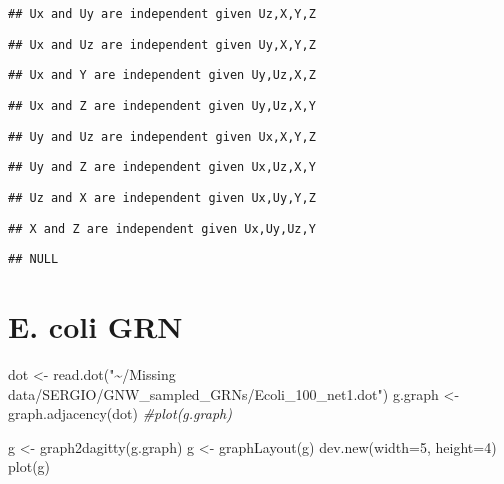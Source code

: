\documentclass[
]{article}
\newenvironment{Shaded}{\begin{snugshade}}{\end{snugshade}}
\newcommand{\AttributeTok}[1]{\textcolor[rgb]{0.77,0.63,0.00}{#1}}
\newcommand{\CommentTok}[1]{\textcolor[rgb]{0.56,0.35,0.01}{\textit{#1}}}
\newcommand{\DecValTok}[1]{\textcolor[rgb]{0.00,0.00,0.81}{#1}}
\newcommand{\FunctionTok}[1]{\textcolor[rgb]{0.00,0.00,0.00}{#1}}
\newcommand{\NormalTok}[1]{#1}
\newcommand{\OtherTok}[1]{\textcolor[rgb]{0.56,0.35,0.01}{#1}}
\newcommand{\StringTok}[1]{\textcolor[rgb]{0.31,0.60,0.02}{#1}}
\begin{document}
\begin{verbatim}
## Ux and Uy are independent given Uz,X,Y,Z
\end{verbatim}

\begin{verbatim}
## Ux and Uz are independent given Uy,X,Y,Z
\end{verbatim}

\begin{verbatim}
## Ux and Y are independent given Uy,Uz,X,Z
\end{verbatim}

\begin{verbatim}
## Ux and Z are independent given Uy,Uz,X,Y
\end{verbatim}

\begin{verbatim}
## Uy and Uz are independent given Ux,X,Y,Z
\end{verbatim}

\begin{verbatim}
## Uy and Z are independent given Ux,Uz,X,Y
\end{verbatim}

\begin{verbatim}
## Uz and X are independent given Ux,Uy,Y,Z
\end{verbatim}

\begin{verbatim}
## X and Z are independent given Ux,Uy,Uz,Y
\end{verbatim}

\begin{verbatim}
## NULL
\end{verbatim}

\hypertarget{e.-coli-grn}{%
\section{E. coli GRN}\label{e.-coli-grn}}

\begin{Shaded}
\begin{Highlighting}[]
\NormalTok{dot }\OtherTok{\textless{}{-}} \FunctionTok{read.dot}\NormalTok{(}\StringTok{"\textasciitilde{}/Missing data/SERGIO/GNW\_sampled\_GRNs/Ecoli\_100\_net1.dot"}\NormalTok{)}
\NormalTok{g.graph }\OtherTok{\textless{}{-}} \FunctionTok{graph.adjacency}\NormalTok{(dot)}
\CommentTok{\#plot(g.graph)}
\end{Highlighting}
\end{Shaded}

\begin{Shaded}
\begin{Highlighting}[]
\NormalTok{g }\OtherTok{\textless{}{-}} \FunctionTok{graph2dagitty}\NormalTok{(g.graph)}
\NormalTok{g }\OtherTok{\textless{}{-}} \FunctionTok{graphLayout}\NormalTok{(g)}
\FunctionTok{dev.new}\NormalTok{(}\AttributeTok{width=}\DecValTok{5}\NormalTok{, }\AttributeTok{height=}\DecValTok{4}\NormalTok{)}
\FunctionTok{plot}\NormalTok{(g)}
\end{Highlighting}
\end{Shaded}
\end{document}
